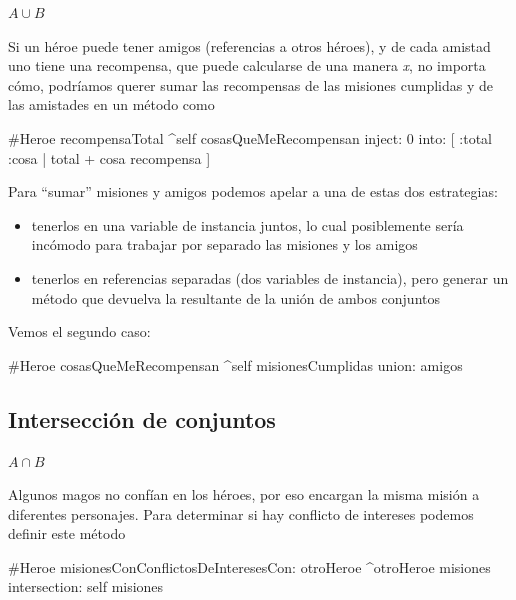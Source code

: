 \documentclass[a4paper,12pt]{book}
\begin{document}
\begin{mdframed}[style=BoxFrame]
\( A \cup B \)
\end{mdframed}

Si un héroe puede tener amigos (referencias a otros héroes), y de cada amistad uno tiene una recompensa, que 
puede calcularse de una manera \textit{x}, no importa cómo, podríamos querer sumar las recompensas de las misiones
cumplidas y de las amistades en un método como

\begin{code}
#Heroe
recompensaTotal
   ^self cosasQueMeRecompensan 
            inject: 0
            into: [ :total :cosa | total + cosa recompensa ]
\end{code}

\vspace{\baselineskip}
Para ``sumar'' misiones y amigos podemos apelar a una de estas dos estrategias:

\begin{itemize}
 \item tenerlos en una variable de instancia juntos, lo cual posiblemente sería incómodo para trabajar
 por separado las misiones y los amigos
 \item tenerlos en referencias separadas (dos variables de instancia), pero generar un método que devuelva
 la resultante de la unión de ambos conjuntos
\end{itemize}

Vemos el segundo caso:

\begin{code}
#Heroe
cosasQueMeRecompensan
    ^self misionesCumplidas union: amigos
\end{code}

\subsection{Intersección de conjuntos}

\begin{mdframed}[style=BoxFrame]
\( A \cap B \)
\end{mdframed}

Algunos magos no confían en los héroes, por eso encargan la misma misión a diferentes personajes. Para determinar
si hay conflicto de intereses podemos definir este método

\begin{code}
#Heroe
misionesConConflictosDeInteresesCon: otroHeroe
     ^otroHeroe misiones intersection: self misiones
\end{code}
\end{document}
